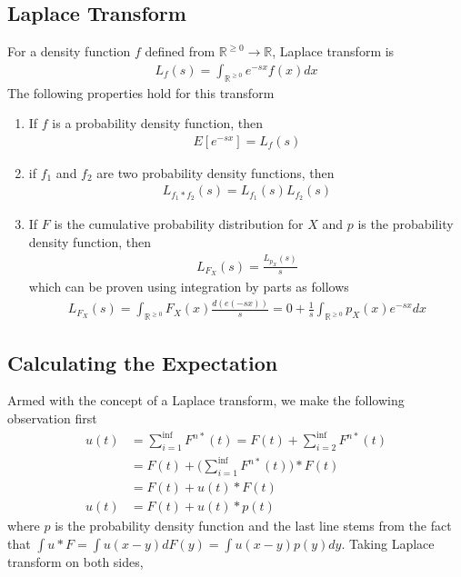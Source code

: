 \documentclass[../probability-notes.tex]{subfiles}
\begin{document}
    \subsection{Laplace Transform}
    For a density function $f$ defined from $\mathbb{R}^{\geq 0} \to \mathbb{R}$, Laplace transform is
    \begin{align*}
        L_{f}(s) = \int_{\mathbb{R}^{\geq 0}} e^{-sx} f(x) dx
    \end{align*}
    The following properties hold for this transform
    \begin{enumerate}
        \item If $f$ is a probability density function, then
        \begin{align*}
            E[e^{-sx}] = L_{f}(s)
        \end{align*}
        
        \item if $f_{1}$ and $f_{2}$ are two probability density functions, then
        \begin{align*}
            L_{f_{1}*f_{2}}(s) = L_{f_{1}}(s) L_{f_{2}}(s)
        \end{align*}
        
        \item \label{itm:laplace3} If $F$ is the cumulative probability distribution for $X$ and $p$ is the probability density function, then
        \begin{align*}
            L_{F_{X}}(s) = \frac{L_{p_{X}}(s)}{s}
        \end{align*}
        which can be proven using integration by parts as follows
        \begin{align*}
            L_{F_{X}}(s) = \int_{\mathbb{R}^{\geq 0}} F_{X}(x) \frac{d(e(-sx))}{s} = 0 + \frac{1}{s} \int_{\mathbb{R}^{\geq 0}} p_{X}(x) e^{-sx} dx
        \end{align*}
    \end{enumerate}

    \subsection{Calculating the Expectation}
    Armed with the concept of a Laplace transform, we make the following observation first
    \begin{align*}
        u(t) &= \sum_{i=1}^{\inf} F^{n*}(t) = F(t) + \sum_{i=2}^{\inf} F^{n*}(t)\\
        &= F(t) + \big( \sum_{i=1}^{\inf} F^{n*}(t) \big) * F(t)\\
        &= F(t) + u(t) * F(t)\\
       u(t) &= F(t) + u(t) * p(t)
    \end{align*}
    where $p$ is the probability density function and the last line stems from the fact that $\int u * F = \int u(x-y) dF(y) = \int u(x-y) p(y) dy$. Taking Laplace transform on both sides,
\end{document}
